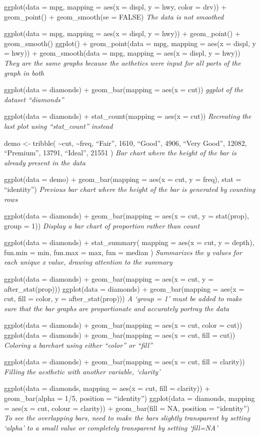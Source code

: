\documentclass[
]{article}
\begin{document}
ggplot(data = mpg, mapping = aes(x = displ, y = hwy, color = drv)) +
geom\_point() + geom\_smooth(se = FALSE) \emph{The data is not smoothed}

ggplot(data = mpg, mapping = aes(x = displ, y = hwy)) + geom\_point() +
geom\_smooth() ggplot() + geom\_point(data = mpg, mapping = aes(x =
displ, y = hwy)) + geom\_smooth(data = mpg, mapping = aes(x = displ, y =
hwy)) \emph{They are the same graphs because the aethetics were input
for all parts of the graph in both}

ggplot(data = diamonds) + geom\_bar(mapping = aes(x = cut)) \emph{ggplot
of the dataset ``diamonds''}

ggplot(data = diamonds) + stat\_count(mapping = aes(x = cut))
\emph{Recreating the last plot using ``stat\_count'' instead}

demo \textless- tribble( \textasciitilde cut, \textasciitilde freq,
``Fair'', 1610, ``Good'', 4906, ``Very Good'', 12082, ``Premium'',
13791, ``Ideal'', 21551 ) \emph{Bar chart where the height of the bar is
already present in the data}

ggplot(data = demo) + geom\_bar(mapping = aes(x = cut, y = freq), stat =
``identity'') \emph{Previous bar chart where the height of the bar is
generated by counting rows}

ggplot(data = diamonds) + geom\_bar(mapping = aes(x = cut, y =
stat(prop), group = 1)) \emph{Display a bar chart of proportion rather
than count}

ggplot(data = diamonds) + stat\_summary( mapping = aes(x = cut, y =
depth), fun.min = min, fun.max = max, fun = median ) \emph{Summarizes
the y values for each unique x value, drawing attention to the summary}

ggplot(data = diamonds) + geom\_bar(mapping = aes(x = cut, y =
after\_stat(prop))) ggplot(data = diamonds) + geom\_bar(mapping = aes(x
= cut, fill = color, y = after\_stat(prop))) \emph{A `group = 1' must be
added to make sure that the bar graphs are proportionate and accurately
portray the data}

ggplot(data = diamonds) + geom\_bar(mapping = aes(x = cut, color = cut))
ggplot(data = diamonds) + geom\_bar(mapping = aes(x = cut, fill = cut))
\emph{Coloring a barchart using either ``color'' or ``fill''}

ggplot(data = diamonds) + geom\_bar(mapping = aes(x = cut, fill =
clarity)) \emph{Filling the aesthetic with another variable, `clarity'}

ggplot(data = diamonds, mapping = aes(x = cut, fill = clarity)) +
geom\_bar(alpha = 1/5, position = ``identity'') ggplot(data = diamonds,
mapping = aes(x = cut, colour = clarity)) + geom\_bar(fill = NA,
position = ``identity'') \emph{To see the overlapping bars, need to make
the bars slightly transparent by setting `alpha' to a small value or
completely transparent by setting `fill=NA'}
\end{document}
